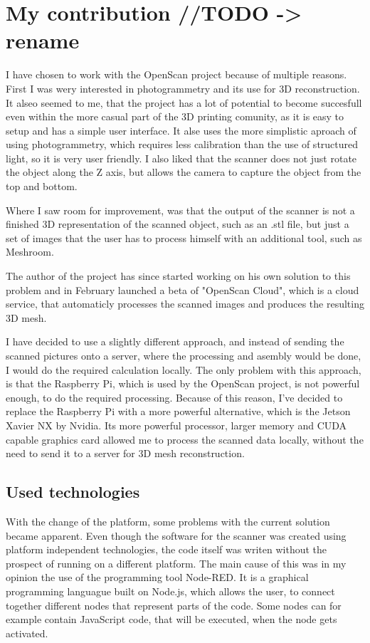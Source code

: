 \chapter{My contribution //TODO -> rename}
\label{sec:contribution}
I have chosen to work with the OpenScan project because of multiple reasons.
First I was wery interested in photogrammetry and its use for 3D reconstruction.
It alseo seemed to me, that the project has a lot of potential to become succesfull even within the more casual part of the 3D printing comunity, as it is easy to setup and has a simple user interface.
It alse uses the more simplistic aproach of using photogrammetry, which requires less calibration than the use of structured light, so it is very user friendly.
I also liked that the scanner does not just rotate the object along the Z axis, but allows the camera to capture the object from the top and bottom.

Where I saw room for improvement, was that the output of the scanner is not a finished 3D representation of the scanned object, such as an .stl file, but just a set of images that the user has to process himself with an additional tool, such as Meshroom.

The author of the project has since started working on his own solution to this problem and in February launched a beta of "OpenScan Cloud", which is a cloud service, that automaticly processes the scanned images and produces the resulting 3D mesh. \cite{openscanCloud}

I have decided to use a slightly different approach, and instead of sending the scanned pictures onto a server, where the processing and asembly would be done, I would do the required calculation locally.
The only problem with this approach, is that the Raspberry Pi, which is used by the OpenScan project, is not powerful enough, to do the required processing.
Because of this reason, I've decided to replace the Raspberry Pi with a more powerful alternative, which is the Jetson Xavier NX by Nvidia.
Its more powerful processor, larger memory and CUDA capable graphics card allowed me to process the scanned data locally, without the need to send it to a server for 3D mesh reconstruction.

\section{Used technologies}
With the change of the platform, some problems with the current solution became apparent.
Even though the software for the scanner was created using platform independent technologies, the code itself was writen without the prospect of running on a different platform.
The main cause of this was in my opinion the use of the programming tool Node-RED.
It is a graphical programming languague built on Node.js, which allows the user, to connect together different nodes that represent parts of the code. \cite{node-red}
Some nodes can for example contain JavaScript code, that will be executed, when the node gets activated.

